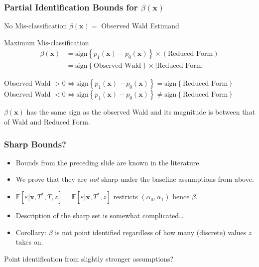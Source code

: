 \documentclass{beamer}
\begin{document}
\begin{frame}
  \frametitle{Partial Identification Bounds for $\beta(\mathbf{x})$}

    \begin{block}{No Mis-classification}
      $\beta(\mathbf{x}) = $ Observed Wald Estimand
    \end{block}

    \begin{block}{Maximum Mis-classification}
      \vspace{-1.5em}
      \begin{align*}
        \beta(\mathbf{x}) &=\mbox{sign}\left\{ p_1(\mathbf{x}) - p_0(\mathbf{x}) \right\}\times (\mbox{Reduced Form})\\
        &=\mbox{sign}\left\{ \mbox{Observed Wald} \right\} \times |\mbox{Reduced Form}|
      \end{align*}
      
      \vspace{1em}
    \footnotesize Observed Wald $> 0\iff \mbox{sign}\left\{ p_1(\mathbf{x}) - p_0(\mathbf{x}) \right\} = \mbox{sign}\left\{ \mbox{Reduced Form} \right\}$ \\
    \footnotesize Observed Wald $< 0\iff \mbox{sign}\left\{ p_1(\mathbf{x}) - p_0(\mathbf{x}) \right\} \neq \mbox{sign}\left\{ \mbox{Reduced Form} \right\}$ 
    \end{block}

    \vspace{1em}
    \begin{alertblock}{
        $\beta(\mathbf{x})$ has the same sign as the observed Wald and its magnitude is between that of Wald and Reduced Form.}
    \end{alertblock}

\end{frame}
\begin{frame}
  \frametitle{Sharp Bounds?}

  \begin{itemize}
    \item Bounds from the preceding slide are known in the literature.
    \item We prove that they are \emph{not} sharp under the baseline assumptions from above.
      \item $\mathbb{E}[\varepsilon|\mathbf{x},T^*,T,z] = \mathbb{E}[\varepsilon|\mathbf{x},T^*,z]$ restricts $(\alpha_0,\alpha_1)$ hence $\beta$.
    \item Description of the sharp set is somewhat complicated\dots
    \item Corollary: $\beta$ is not point identified regardless of how many (discrete) values $z$ takes on.
  \end{itemize}

  \begin{alertblock}{Point identification from slightly stronger assumptions?}
  \end{alertblock}

\end{frame}
\end{document}
